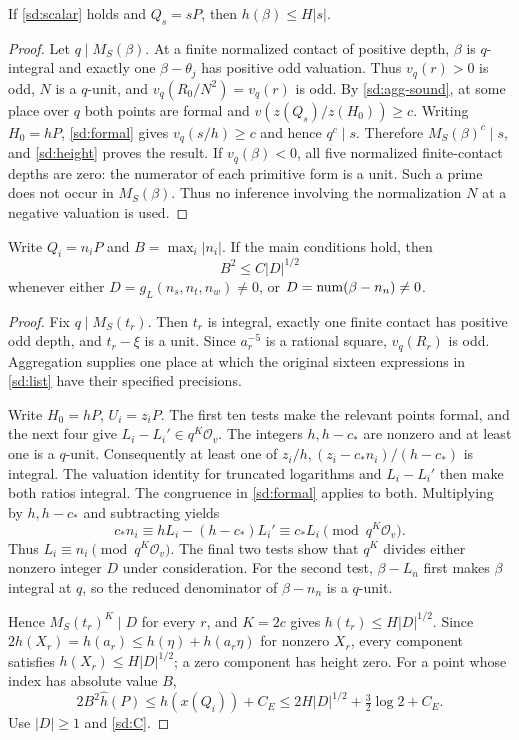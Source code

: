 \begin{sdlemma}\label{sd:scalar-height}
If \eqref{sd:scalar} holds and $Q_s=sP$, then $h(\beta)\le H|s|$.
\end{sdlemma}
\begin{proof}
Let $q\mid M_S(\beta)$. At a finite normalized contact of positive depth,
$\beta$ is $q$-integral and exactly one $\beta-\theta_j$ has positive odd
valuation. Thus $v_q(r)>0$ is odd, $N$ is a $q$-unit, and
$v_q(R_0/N^2)=v_q(r)$ is odd. By \eqref{sd:agg-sound}, at some place over
$q$ both points are formal and $v(z(Q_s)/z(H_0))\ge c$.
Writing $H_0=hP$, \eqref{sd:formal} gives $v_q(s/h)\ge c$ and hence $q^c\mid s$.
Therefore $M_S(\beta)^c\mid s$, and \eqref{sd:height} proves the result.
If $v_q(\beta)<0$, all five normalized finite-contact depths are zero:
the numerator of each primitive form is a unit. Such a prime does not
occur in $M_S(\beta)$. Thus no inference involving the normalization $N$
at a negative valuation is used.
\end{proof}

\begin{sdlemma}\label{sd:main-errors}
Write $Q_i=n_iP$ and $B=\max_i|n_i|$. If the main conditions hold, then
\[
 B^2\le C|D|^{1/2}
\]
whenever either $D=g_L(n_s,n_t,n_w)\ne0$, or
$D=\operatorname{num}(\beta-n_n)\ne0$.
\end{sdlemma}
\begin{proof}
Fix $q\mid M_S(t_r)$. Then $t_r$ is integral, exactly one finite contact
has positive odd depth, and $t_r-\xi$ is a unit. Since $a_r^{-5}$ is a
rational square, $v_q(R_r)$ is odd. Aggregation supplies one place at which
the original sixteen expressions in \eqref{sd:list} have their specified
precisions.

Write $H_0=hP$, $U_i=z_iP$. The first ten tests make the relevant points
formal, and the next four give $L_i-L_i'\in q^K\mathcal O_v$.
The integers $h,h-c_*$ are nonzero and at least one is a $q$-unit.
Consequently at least one of $z_i/h,(z_i-c_*n_i)/(h-c_*)$ is integral.
The valuation identity for truncated logarithms and $L_i-L_i'$ then make
both ratios integral. The congruence in \eqref{sd:formal} applies to both.
Multiplying by $h,h-c_*$ and subtracting yields
\[
 c_*n_i\equiv hL_i-(h-c_*)L_i'\equiv c_*L_i\pmod{q^K\mathcal O_v}.
\]
Thus $L_i\equiv n_i\pmod{q^K\mathcal O_v}$. The final two tests show
that $q^K$ divides either nonzero integer $D$ under consideration. For the
second test, $\beta-L_n$ first makes $\beta$ integral at $q$, so the reduced
denominator of $\beta-n_n$ is a $q$-unit.

Hence $M_S(t_r)^K\mid D$ for every $r$, and $K=2c$ gives
$h(t_r)\le H|D|^{1/2}$. Since
$2h(X_r)=h(a_r)\le h(\eta)+h(a_r\eta)$ for nonzero $X_r$,
every component satisfies $h(X_r)\le H|D|^{1/2}$; a zero component has
height zero. For a point whose index has absolute value $B$,
\[
 2B^2\widehat h(P)
 \le h(x(Q_i))+C_E
 \le 2H|D|^{1/2}+\tfrac32\log2+C_E.
\]
Use $|D|\ge1$ and \eqref{sd:C}.
\end{proof}

